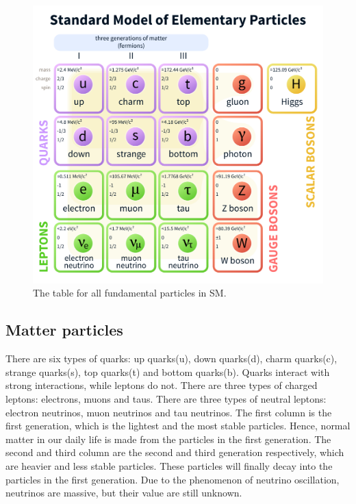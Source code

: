 \begin{figure}
\centering
\includegraphics[width=\textwidth]{data/photo/theory/SM_particles.png}
\caption{The table for all fundamental particles in SM. \cite{SM_particles}}
\label{fig:SM_particles}
\end{figure}

\subsection{Matter particles}
There are six types of quarks: up quarks(u), down quarks(d), charm quarks(c), strange quarks(s), top quarks(t) and bottom quarks(b).
Quarks interact with strong interactions, while leptons do not.
There are three types of charged leptons: electrons, muons and taus.
There are three types of neutral leptons: electron neutrinos, muon neutrinos and tau neutrinos.
The first column is the first generation, which is the lightest and the most stable particles.
Hence, normal matter in our daily life is made from the particles in the first generation.
The second and third column are the second and third generation respectively, which are heavier and less stable particles.
These particles will finally decay into the particles in the first generation.
Due to the phenomenon of neutrino oscillation, neutrinos are massive, but their value are still unknown.

